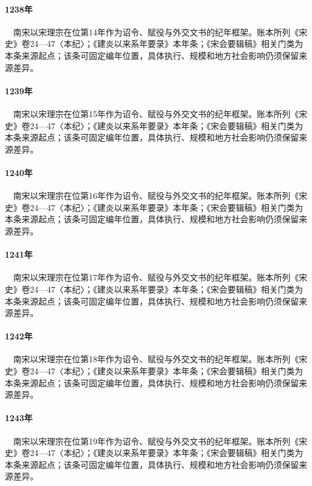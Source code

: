\paragraph{1238年}　南宋以宋理宗在位第14年作为诏令、赋役与外交文书的纪年框架。账本所列《宋史》卷24—47〈本纪〉；《建炎以来系年要录》本年条；《宋会要辑稿》相关门类为本条来源起点；该条可固定编年位置，具体执行、规模和地方社会影响仍须保留来源差异。

\paragraph{1239年}　南宋以宋理宗在位第15年作为诏令、赋役与外交文书的纪年框架。账本所列《宋史》卷24—47〈本纪〉；《建炎以来系年要录》本年条；《宋会要辑稿》相关门类为本条来源起点；该条可固定编年位置，具体执行、规模和地方社会影响仍须保留来源差异。

\paragraph{1240年}　南宋以宋理宗在位第16年作为诏令、赋役与外交文书的纪年框架。账本所列《宋史》卷24—47〈本纪〉；《建炎以来系年要录》本年条；《宋会要辑稿》相关门类为本条来源起点；该条可固定编年位置，具体执行、规模和地方社会影响仍须保留来源差异。

\paragraph{1241年}　南宋以宋理宗在位第17年作为诏令、赋役与外交文书的纪年框架。账本所列《宋史》卷24—47〈本纪〉；《建炎以来系年要录》本年条；《宋会要辑稿》相关门类为本条来源起点；该条可固定编年位置，具体执行、规模和地方社会影响仍须保留来源差异。

\paragraph{1242年}　南宋以宋理宗在位第18年作为诏令、赋役与外交文书的纪年框架。账本所列《宋史》卷24—47〈本纪〉；《建炎以来系年要录》本年条；《宋会要辑稿》相关门类为本条来源起点；该条可固定编年位置，具体执行、规模和地方社会影响仍须保留来源差异。

\paragraph{1243年}　南宋以宋理宗在位第19年作为诏令、赋役与外交文书的纪年框架。账本所列《宋史》卷24—47〈本纪〉；《建炎以来系年要录》本年条；《宋会要辑稿》相关门类为本条来源起点；该条可固定编年位置，具体执行、规模和地方社会影响仍须保留来源差异。

